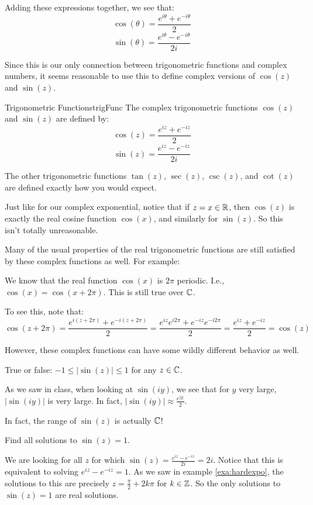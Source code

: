 Adding these expressions together, we see that:
$$\cos(\theta) = \frac{e^{i\theta} + e^{-i\theta}}{2}$$
$$\sin(\theta) = \frac{e^{i\theta} - e^{-i\theta}}{2i}$$

Since this is our only connection between trigonometric functions and complex numbers, it seems reasonable to use this to define complex versions of $\cos(z)$ and $\sin(z)$.

\begin{defbo}{Trigonometric Functions}{trigFunc} The complex trigonometric functions $\cos(z)$ and $\sin(z)$ are defined by:
$$\cos(z) = \frac{e^{iz} + e^{-iz}}{2}$$
$$\sin(z) = \frac{e^{iz} - e^{-iz}}{2i}$$

The other trigonometric functions $\tan(z)$, $\sec(z)$, $\csc(z)$, and $\cot(z)$ are defined exactly how you would expect.
\end{defbo}

Just like for our complex exponential, notice that if $z = x\in \mathbb{R}$, then $\cos(z)$ is exactly the real cosine function $\cos(x)$, and similarly for $\sin(z)$. So this isn't totally unreasonable.


Many of the usual properties of the real trigonometric functions are still satisfied by these complex functions as well. For example:

\begin{ex}{}{} We know that the real function $\cos(x)$ is $2\pi$ periodic. I.e., $\cos(x) = \cos(x + 2\pi)$. This is still true over $\mathbb{C}$.

To see this, note that:
$$\cos(z + 2\pi) = \frac{e^{i(z + 2\pi)} + e^{-i(z + 2\pi)}}{2} = \frac{e^{iz}e^{i2\pi} + e^{-iz}e^{-i2\pi}}{2} = \frac{e^{iz} + e^{-iz}}{2} = \cos(z)$$
\end{ex}

However, these complex functions can have some wildly different behavior as well.

\begin{ex}{}{} True or false: $-1 \le |\sin(z)| \le 1$ for any $z\in \mathbb{C}$.

As we saw in class, when looking at $\sin(iy)$, we see that for $y$ very large, $|\sin(iy)|$ is very large. In fact, $|\sin(iy)| \approx \frac{e^{|y|}}{2}$.

In fact, the range of $\sin(z)$ is actually $\mathbb{C}$!

\end{ex}

\begin{ex}{}{} Find all solutions to $\sin(z) = 1$.

We are looking for all $z$ for which $\sin(z) = \frac{e^{iz} - e^{-iz}}{2i} = 2i$. Notice that this is equivalent to solving $e^{iz} - e^{-iz} = 1$. As we saw in example \ref{exa:hardexpo}, the solutions to this are precisely $z = \frac{\pi}{2} + 2k\pi$ for $k\in \mathbb{Z}$. So the only solutions to $\sin(z) = 1$ are real solutions.

\end{ex}

